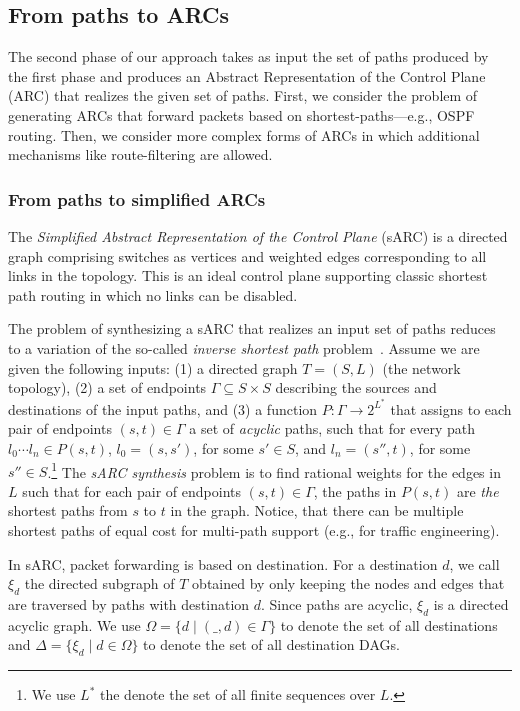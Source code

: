 


\subsection{From paths to ARCs} \label{sec:phase2}

The second phase of our approach takes as input the set of paths produced by the first phase
and produces an Abstract Representation of the Control Plane (ARC) that realizes the given set of paths.
First, we consider the problem of generating ARCs that
 forward packets based on shortest-paths---e.g., OSPF routing.
Then, we consider more complex forms of ARCs in which 
 additional mechanisms like route-filtering are allowed. 
 
\subsubsection{From paths to simplified ARCs} \label{sec:sarc}
The \emph{Simplified Abstract Representation of the Control Plane} (sARC) is a directed graph comprising switches as 
vertices and weighted edges corresponding to all links in the
topology. 
This is an ideal control plane supporting classic shortest path routing in which no links can be disabled. 

The problem of synthesizing 
a sARC that realizes an input set of paths reduces to a
variation of the so-called {\em inverse shortest path} problem~\cite{isp}. 
Assume we are given the following inputs: (1) a directed graph $T = (S, L)$ (the network topology), 
(2) a set of endpoints $\Gamma \subseteq S\times S$
describing the sources and destinations of the input paths, and 
(3) a function $P: \Gamma \rightarrow 2^{L^*}$
that assigns to each pair of endpoints $(s,t) \in \Gamma$ 
a set of \emph{acyclic} paths, such that for every path $l_0\cdots l_n\in P(s,t)$,
$l_0=(s,s')$, for some $s'\in S$, and $l_n=(s'',t)$, for some $s''\in S$.\footnote{
We use $L^*$ the denote the set of all finite sequences over $L$.}
The 
\emph{sARC synthesis}
problem is to find rational weights for the edges in $L$ such that 
for each pair of endpoints $(s,t) \in \Gamma$, 
the paths in $P(s,t)$ are \emph{the} shortest paths from $s$ to $t$ 
in the graph. Notice, that there can be multiple shortest
paths of equal cost for multi-path support (e.g., for traffic engineering).

In sARC, packet forwarding is based on destination.
For a destination $d$, we call $\xi_d$ the directed
subgraph of $T$ obtained by only keeping the nodes and edges 
that are traversed by paths with destination $d$.
Since paths are acyclic, $\xi_d$ is a directed acyclic graph.
We use $\Omega=\{d\mid (\_,d)\in\Gamma\}$ to denote the 
set of all destinations and $\Delta=\{\xi_d\mid d\in \Omega\}$ to denote  
the set of all destination DAGs. 

